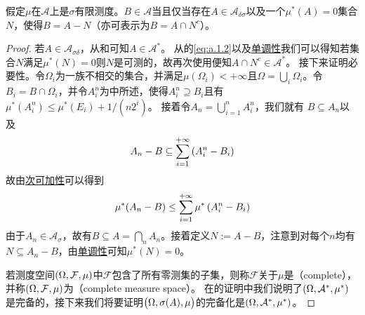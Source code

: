 \documentclass[main.tex]{subfiles}
\begin{document}
\begin{theorem} \label{thm:a.2.2}
	假定\(\mu\)在\(\mathcal{A}\)上是\(\sigma\)有限测度。\(B\in\mathcal{A}\)当且仅当存在\(A\in\mathcal{A}_{\delta\sigma}\)以及一个\(\mu^*(A) = 0\)集合\(N\)，使得\(B=A-N\)（亦可表示为\(B = A\cap N^c\)）。
\end{theorem}
\begin{proof}
	若\(A \in \mathcal{A}_{\sigma\delta}\)，从和可知\(A\in \mathcal{A}^*\)。
	从的\eqref{eq:a.1.2}以及\hyperref[prop:a.1.monotonicity]{单调性}我们可以得知若集合\(N\)满足\(\mu^*(N)=0\)则\(N\)是可测的，故再次使用便知\(A\cap N^c \in \mathcal{A}^*\)。
	接下来证明必要性。令\(\Omega_i\)为一族不相交的集合，并满足\(\mu(\Omega_i) < +\infty\)且\(\Omega = \bigcup_{i} \Omega_i\)。令\(B_i = B\cap\Omega_i\)，并令\(A_i^n\)为中所述，使得\(A_i^n\supseteq B_i\)且有\(\mu^*(A_i^n)\leq \mu^*(E_i) + 1/(n2^i)\)。
	接着令\(A_n = \bigcup_{i=1}^n A_i^n\)，我们就有 \(B\subseteq A_n\)以及
	\[A_n - B \subseteq \sum_{i=1}^{+\infty}\del{A_i^n - B_i}\]
	故由\hyperref[prop:a.1.subadditivity]{次可加性}可以得到
	\[\mu^*(A_n - B) \leq \sum_{i=1}^{+\infty}\mu^*\del{A_i^n - B_i}\]
	由于\(A_n \in \mathcal{A}_\sigma\)，故有\(B \subseteq A = \bigcap_n A_n\)。接着定义\(N := A-B\)，注意到对每个\(n\)均有\(N\subseteq A_n-B\)，由\hyperref[prop:a.1.monotonicity]{单调性}可知\(\mu^*(N) = 0\)。

	若测度空间\(\del{\Omega, \mathcal{F}, \mu}\)中\(\mathcal{F}\)包含了所有零测集的子集，则称\(\mathcal{F}\)关于\(\mu\)是（complete），并称\(\del{\Omega, \mathcal{F}, \mu}\)为（complete measure space）。
	在的证明中我们说明了\(\del{\Omega, \mathcal{A}^*, \mu^*}\)是完备的，接下来我们将要证明\(\del{\Omega, \sigma(A), \mu}\)的完备化是\(\del{\Omega, \mathcal{A}^*, \mu^*}\)。
\end{proof}
\end{document}
